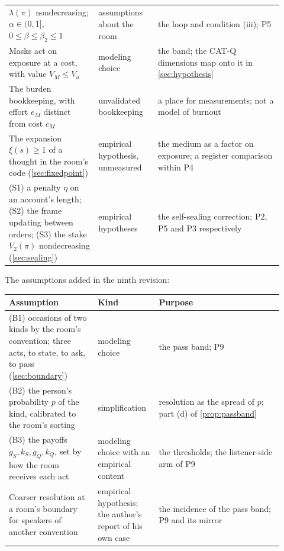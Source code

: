\begin{center}
\begin{tabular}{p{0.3\linewidth} p{0.2\linewidth} p{0.42\linewidth}}
$\lambda(\pi)$ nondecreasing; $\alpha \in (0,1]$, $0 \le \beta \le \beta_2 \le 1$ & assumptions about the room & the loop and condition (iii); P5 \\
Masks act on exposure at a cost, with value $V_M \le V_u$ & modeling choice & the band; the CAT-Q dimensions map onto it in \autoref{sec:hypothesis} \\
The burden bookkeeping, with effort $e_M$ distinct from cost $c_M$ & unvalidated bookkeeping & a place for measurements; not a model of burnout \\
The expansion $\xi(s) \ge 1$ of a thought in the room's code (\autoref{sec:fixedpoint}) & empirical hypothesis, unmeasured & the medium as a factor on exposure; a register comparison within P4 \\
(S1) a penalty $\eta$ on an account's length; (S2) the frame updating between orders; (S3) the stake $V_2(\pi)$ nondecreasing (\autoref{sec:sealing}) & empirical hypotheses & the self-sealing correction; P2, P5 and P3 respectively \\
\bottomrule
\end{tabular}
\end{center}

\noindent The assumptions added in the ninth revision:
\begin{center}\small
\begin{tabular}{p{0.3\linewidth} p{0.2\linewidth} p{0.42\linewidth}}
\toprule
Assumption & Kind & Purpose \\
\midrule
(B1) occasions of two kinds by the room's convention; three acts, to state, to ask, to pass (\autoref{sec:boundary}) & modeling choice & the pass band; P9 \\
(B2) the person's probability $p$ of the kind, calibrated to the room's sorting & simplification & resolution as the spread of $p$; part (d) of \autoref{prop:passband} \\
(B3) the payoffs $g_S, k_S, g_Q, k_Q$, set by how the room receives each act & modeling choice with an empirical content & the thresholds; the listener-side arm of P9 \\
Coarser resolution at a room's boundary for speakers of another convention & empirical hypothesis; the author's report of his own case & the incidence of the pass band; P9 and its mirror \\
\bottomrule
\end{tabular}
\end{center}


